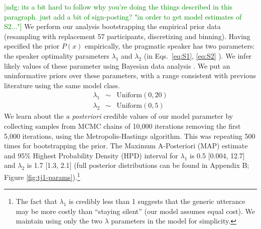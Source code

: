 \documentclass[12pt,letterpaper]{article}
\newcommand{\ndg}[1]{\textcolor{Green}{[ndg: #1]}}
\begin{document}
\ndg{its a bit hard to follow why you're doing the things described in this paragraph. just add a bit of sign-posting? "in order to get model estimates of S2..."}
We perform our analysis bootstrapping the empirical prior data (resampling with replacement 57 participants, discretizing and binning). 
Having specified the prior $P(x)$ empirically, the pragmatic speaker has two parameters: the speaker optimality parameters $\lambda_1$ and $\lambda_2$ (in Eqs.~\ref{eq:S1}, \ref{eq:S2} ).
We infer likely values of these parameter using Bayesian data analysis \cite{LW2014}.
We put an uninformative priors over these parameters, with a range consistent with previous literature using the same model class.
%
\begin{eqnarray*}
\lambda_1 &\sim& \text{Uniform}(0,20) \\
\lambda_2 &\sim& \text{Uniform}(0,5)
\end{eqnarray*}
%
We learn about the \emph{a posteriori} credible values of our model parameter by collecting samples from MCMC chains of 10,000 iterations removing the first 5,000 iterations, using the Metropolis-Hastings algorithm. 
This was repeating 500 times for bootstrapping the prior.
The Maximum A-Posteriori (MAP) estimate and 95\% Highest Probability Density (HPD) interval for $\lambda_1$ is 0.5 [0.004, 12.7] and $\lambda_2$ is 1.7 [1.3, 2.1] (full posterior distributions can be found in Appendix B; Figure \ref{fig:tj1-params}).\footnote{
The fact that $\lambda_1$ is credibly less than 1 suggests that the generic utterance may be more costly than ``staying silent'' (our model assumes equal cost).
We maintain using only the two $\lambda$ parameters in the model for simplicity.
}
\end{document}
